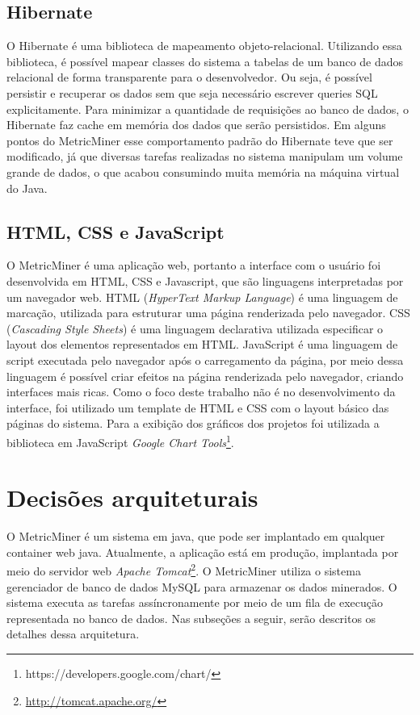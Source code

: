 \documentclass[a4paper, 12pt, twoside]{book}
\begin{document}
        \subsection*{Hibernate}
            O Hibernate é uma biblioteca de mapeamento objeto-relacional. Utilizando essa biblioteca, é possível 
            mapear classes do sistema a tabelas de um banco de dados relacional de forma transparente para o 
            desenvolvedor. Ou seja, é possível persistir e recuperar os dados sem que seja necessário escrever 
            queries SQL explicitamente. Para minimizar a  quantidade de requisições ao banco de dados, o Hibernate 
            faz cache em memória dos dados que serão persistidos. Em alguns pontos do MetricMiner esse 
            comportamento padrão do Hibernate teve que ser modificado, já que diversas tarefas realizadas no 
            sistema manipulam um volume grande de dados, o que acabou consumindo muita memória na máquina virtual 
            do Java.

        \subsection*{HTML, CSS e JavaScript}
            O MetricMiner é uma aplicação web, portanto a interface com o usuário foi desenvolvida em HTML, CSS e Javascript, que são linguagens interpretadas por um navegador web. HTML (\textit{HyperText Markup Language}) é uma linguagem de marcação, utilizada para estruturar uma página renderizada pelo navegador. CSS (\textit{Cascading Style Sheets}) é uma linguagem declarativa utilizada especificar o layout dos elementos representados em HTML. JavaScript é uma linguagem de script executada pelo navegador após o carregamento da página, por meio dessa linguagem é possível criar efeitos na página renderizada pelo navegador, criando interfaces mais ricas. Como o foco deste trabalho não é no desenvolvimento da interface, foi utilizado um template de HTML e CSS com o layout básico das páginas do sistema. Para a exibição dos gráficos dos projetos foi utilizada a biblioteca em JavaScript \textit{Google Chart Tools}\footnote{https://developers.google.com/chart/}.



    \section{Decisões arquiteturais} \label{sc:arquitetura}

    O MetricMiner é um sistema em java, que pode ser implantado em qualquer container web java. Atualmente, a aplicação está em produção, implantada por meio do servidor web \textit{Apache Tomcat}\footnote{\url{http://tomcat.apache.org/}}. O MetricMiner utiliza o sistema gerenciador de banco de dados MySQL para armazenar os dados minerados. O sistema executa as tarefas assíncronamente por meio de um fila de execução representada no banco de dados. Nas subseções a seguir, serão descritos os detalhes dessa arquitetura.
\end{document}
